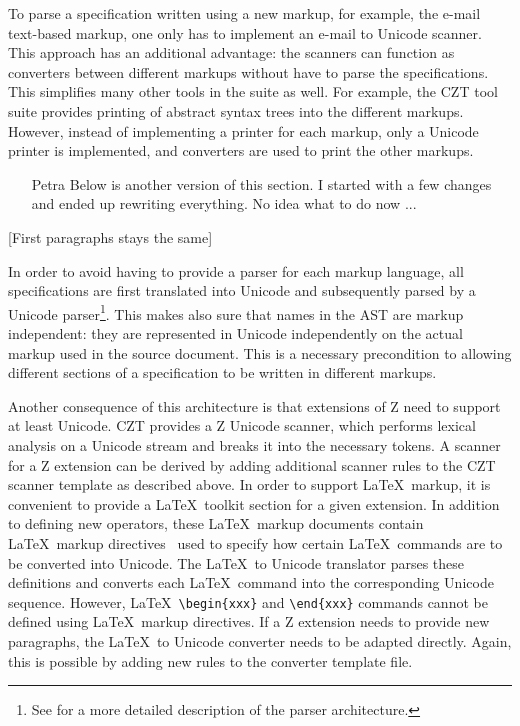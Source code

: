 \documentclass{llncs}
\begin{document}
To parse a specification written using a new markup, for example, the
e-mail text-based markup, one only has to implement an e-mail to Unicode
scanner. This approach has an additional advantage: the scanners can function as
converters between different markups without have to parse the
specifications. This simplifies many other tools in the suite as
well. For example, the CZT tool suite provides printing of abstract
syntax trees into the different markups. However, instead of
implementing a printer for each markup, only a Unicode printer is
implemented, and converters are used to print the other markups.

  \begin{itemize}
    \item[Petra] Below is another version of this section.  I started
    with a few changes and ended up rewriting everything.  No idea
    what to do now ...
  \end{itemize}

[First paragraphs stays the same]

In order to avoid having to provide a parser for each markup language,
all specifications are first translated into Unicode and subsequently
parsed by a Unicode parser\footnote{See \cite{czt} for a more detailed
description of the parser architecture.}.  This makes also sure that
names in the AST are markup independent: they are represented in
Unicode independently on the actual markup used in the source
document.  This is a necessary precondition to allowing different
sections of a specification to be written in different markups.

Another consequence of this architecture is that extensions of Z need
to support at least Unicode.  CZT provides a Z Unicode scanner, which
performs lexical analysis on a Unicode stream and breaks it into the
necessary tokens.  A scanner for a Z extension can be derived by
adding additional scanner rules to the CZT scanner template as
described above.  In order to support \LaTeX\ markup, it is convenient
to provide a \LaTeX\ toolkit section for a given extension.  In
addition to defining new operators, these \LaTeX\ markup documents
contain \LaTeX\ markup directives~\cite{isoz,czt} used to specify how
certain \LaTeX\ commands are to be converted into Unicode.  The
\LaTeX\ to Unicode translator parses these definitions and converts
each \LaTeX\ command into the corresponding Unicode sequence.
However, \LaTeX\ \verb+\begin{xxx}+ and \verb+\end{xxx}+ commands
cannot be defined using \LaTeX\ markup directives.  If a Z extension
needs to provide new paragraphs, the \LaTeX\ to Unicode converter
needs to be adapted directly.  Again, this is possible by adding new
rules to the converter template file.
\end{document}
